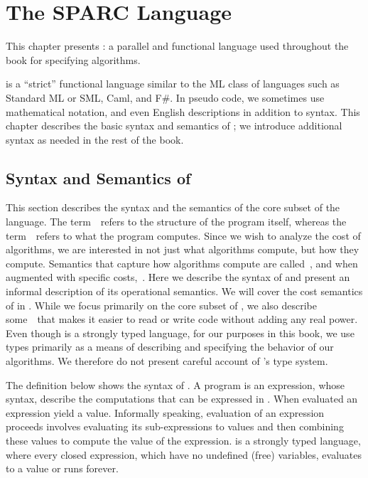 \chapter{The SPARC Language}
\label{ch:sparc}

\begin{preamble}
This chapter presents \pml{}: a parallel and functional language used
throughout the book for specifying algorithms.

%
\pml is a ``strict'' functional language similar to the ML class of
languages such as Standard ML or SML, Caml, and F\#.
%
In pseudo code, we sometimes use mathematical notation, and even
English descriptions in addition to \pml{} syntax.
%
This chapter describes the basic syntax and semantics of \pml{}; we
introduce additional syntax as needed in the rest of the book.
\end{preamble}

\section{Syntax and Semantics of \pml{}}

\begin{gram}
This section describes the syntax and the semantics of the core subset
of the \pml{} language.  The term~~refers to the
structure of the program itself, whereas the
term~~refers to what the program computes.
%
Since we wish to analyze the cost of algorithms, we are interested in
not just what algorithms compute, but how they compute.
%
Semantics that capture how algorithms compute are
called~, and when augmented with specific
costs,~.
%
Here we describe the syntax of \pml{} and present an informal
description of its operational semantics. 
%
We will cover the cost semantics of \pml in .
%
While we focus primarily on the core subset of \pml, we also describe
some~~that makes it easier to read or write code
without adding any real power.
%
Even though \pml is a strongly typed language, for our purposes in
this book, we use types primarily as a means of describing and
specifying the behavior of our algorithms.
%
We therefore do not present careful account of \pml's type system.
\end{gram}


\begin{gram}
The definition below shows the syntax of \pml{}.
%
A \pml{} program is an expression, whose syntax,
 describe the computations that can be expressed in \pml{}.
%
When evaluated an expression yield a value.
%
Informally speaking, evaluation of an expression proceeds involves
evaluating its sub-expressions to values and then combining these
values  to compute the value of the expression.
%
\pml{} is a strongly typed language, where every closed expression,
which have no undefined (free) variables, evaluates to a value or runs
forever.
%
\end{gram}

